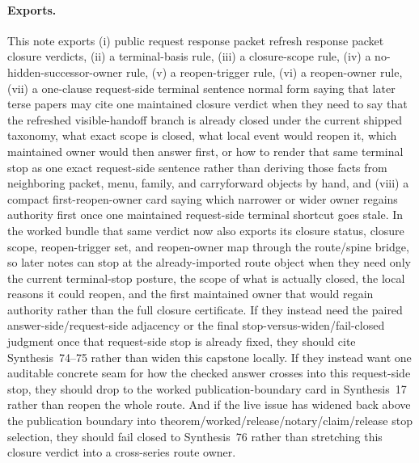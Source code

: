 \documentclass[11pt]{article}
\begin{document}
\paragraph{Exports.}
This note exports (i) public request response packet refresh response packet closure verdicts, (ii) a terminal-basis rule, (iii) a closure-scope rule, (iv) a no-hidden-successor-owner rule, (v) a reopen-trigger rule, (vi) a reopen-owner rule, (vii) a one-clause request-side terminal sentence normal form saying that later terse papers may cite one maintained closure verdict when they need to say that the refreshed visible-handoff branch is already closed under the current shipped taxonomy, what exact scope is closed, what local event would reopen it, which maintained owner would then answer first, or how to render that same terminal stop as one exact request-side sentence rather than deriving those facts from neighboring packet, menu, family, and carryforward objects by hand, and (viii) a compact first-reopen-owner card saying which narrower or wider owner regains authority first once one maintained request-side terminal shortcut goes stale. In the worked bundle that same verdict now also exports its closure status, closure scope, reopen-trigger set, and reopen-owner map through the route/spine bridge, so later notes can stop at the already-imported route object when they need only the current terminal-stop posture, the scope of what is actually closed, the local reasons it could reopen, and the first maintained owner that would regain authority rather than the full closure certificate. If they instead need the paired answer-side/request-side adjacency or the final stop-versus-widen/fail-closed judgment once that request-side stop is already fixed, they should cite Synthesis~74--75 rather than widen this capstone locally. If they instead want one auditable concrete seam for how the checked answer crosses into this request-side stop, they should drop to the worked publication-boundary card in Synthesis~17 rather than reopen the whole route. And if the live issue has widened back above the publication boundary into theorem/worked/release/notary/claim/release stop selection, they should fail closed to Synthesis~76 rather than stretching this closure verdict into a cross-series route owner.
\end{document}
